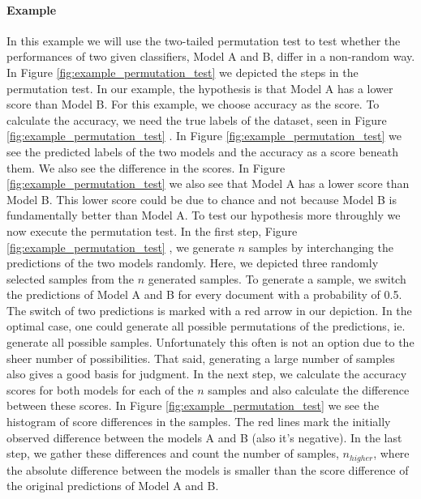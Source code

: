 \paragraph{Example}
In this example we will use the two-tailed permutation test to test whether the 
  performances of two given classifiers, Model A and B, differ in a non-random way.
In Figure \ref{fig:example_permutation_test} we depicted the steps in the permutation test. 
In our example, the hypothesis is that Model A has a lower score than Model B.
For this example, we choose accuracy as the score.
To calculate the accuracy, we need the true labels of the dataset, seen in Figure \ref{fig:example_permutation_test} \textbf{}.
In Figure \ref{fig:example_permutation_test} \textbf{} we see the predicted labels of the two models and the accuracy as a score beneath them. 
We also see the difference in the scores.
In Figure \ref{fig:example_permutation_test} \textbf{} we also see that Model A has a lower score than Model B.
This lower score could be due to chance and not because Model B is fundamentally better than Model A.
To test our hypothesis more throughly we now execute the permutation test.
In the first step, Figure \ref{fig:example_permutation_test} \textbf{}, we generate $n$ samples by interchanging the predictions of the two models randomly.
Here, we depicted three randomly selected samples from the $n$ generated samples.
To generate a sample, we switch the predictions of Model A and B for every document with a probability of 0.5.
The switch of two predictions is marked with a red arrow in our depiction.
In the optimal case, one could generate all possible permutations of the predictions, ie. generate all possible samples.
Unfortunately this often is not an option due to the sheer number of possibilities. That said, generating a large number of samples also gives a good basis for judgment.
In the next step, we calculate the accuracy scores for both models for each of the $n$ samples and also calculate the difference between these scores.
In Figure \ref{fig:example_permutation_test} \textbf{} we see the histogram of score differences in the samples.
The red lines mark the initially observed difference between the models A and B (also it's negative).
In the last step, we gather these differences and count the number of samples, $n_{higher}$, where the absolute difference between the models is smaller than the score difference of the original predictions of Model A and B.
